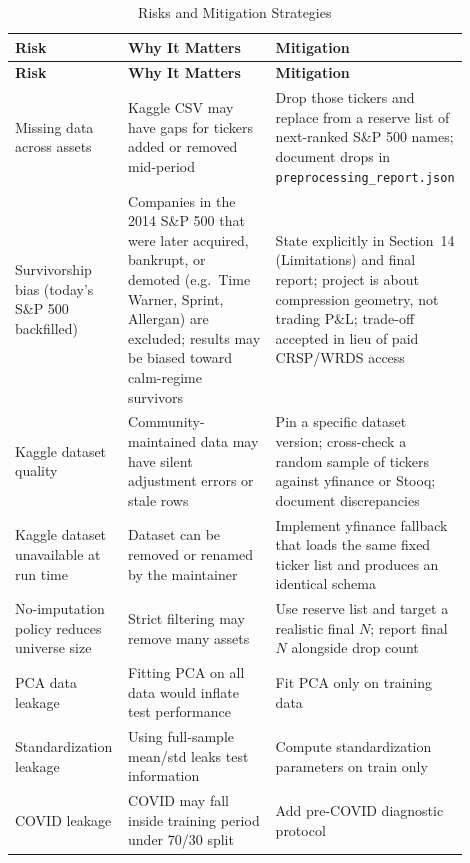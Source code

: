 \documentclass[11pt]{article}
\begin{document}
\begin{longtable}{p{0.25\linewidth} p{0.35\linewidth} p{0.30\linewidth}}
\caption{Risks and Mitigation Strategies} \\
\toprule
\textbf{Risk} & \textbf{Why It Matters} & \textbf{Mitigation} \\
\midrule
\endfirsthead

\toprule
\textbf{Risk} & \textbf{Why It Matters} & \textbf{Mitigation} \\
\midrule
\endhead

Missing data across assets & Kaggle CSV may have gaps for tickers added or removed mid-period & Drop those tickers and replace from a reserve list of next-ranked S\&P 500 names; document drops in \texttt{preprocessing\_report.json} \\

Survivorship bias (today's S\&P 500 backfilled) & Companies in the 2014 S\&P 500 that were later acquired, bankrupt, or demoted (e.g.\ Time Warner, Sprint, Allergan) are excluded; results may be biased toward calm-regime survivors & State explicitly in Section~14 (Limitations) and final report; project is about compression geometry, not trading P\&L; trade-off accepted in lieu of paid CRSP/WRDS access \\

Kaggle dataset quality & Community-maintained data may have silent adjustment errors or stale rows & Pin a specific dataset version; cross-check a random sample of tickers against yfinance or Stooq; document discrepancies \\

Kaggle dataset unavailable at run time & Dataset can be removed or renamed by the maintainer & Implement yfinance fallback that loads the same fixed ticker list and produces an identical schema \\

No-imputation policy reduces universe size & Strict filtering may remove many assets & Use reserve list and target a realistic final $N$; report final $N$ alongside drop count \\

PCA data leakage & Fitting PCA on all data would inflate test performance & Fit PCA only on training data \\

Standardization leakage & Using full-sample mean/std leaks test information & Compute standardization parameters on train only \\

COVID leakage & COVID may fall inside training period under 70/30 split & Add pre-COVID diagnostic protocol \\


\end{longtable}
\end{document}
